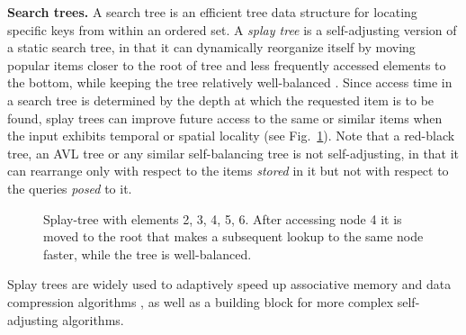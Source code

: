 \noindent%
\textbf{Search trees.} %
A search tree is an efficient tree data structure for locating specific keys from within an ordered set. A \emph{splay tree} is a self-adjusting version of a static search tree, in that it can dynamically reorganize itself by moving popular items closer to the root of tree and less frequently accessed elements to the bottom, while keeping the tree relatively well-balanced \cite{SleatorT85Splay, BoseDL08, Avin0020}. Since access time in a search tree is determined by the depth at which the requested item is to be found, splay trees can improve future access to the same or similar items when the input exhibits temporal or spatial locality (see Fig.~\ref{fig:bst_root_3}).  Note that a red-black tree, an AVL tree or any similar self-balancing tree is not self-adjusting, in that it can rearrange only with respect to the items \emph{stored} in it but not with respect to the queries \emph{posed} to it.

\begin{figure}
 \centering
 \caption{Splay-tree with elements 2, 3, 4, 5, 6. After accessing node 4 it is moved to the root that makes a subsequent lookup to the same node faster, while the tree is well-balanced.}
 \label{fig:bst_root_3}
\end{figure}

Splay trees are widely used to adaptively speed up associative memory and data compression algorithms \cite{jones1988application}, as well as a building block for more complex self-adjusting algorithms.

